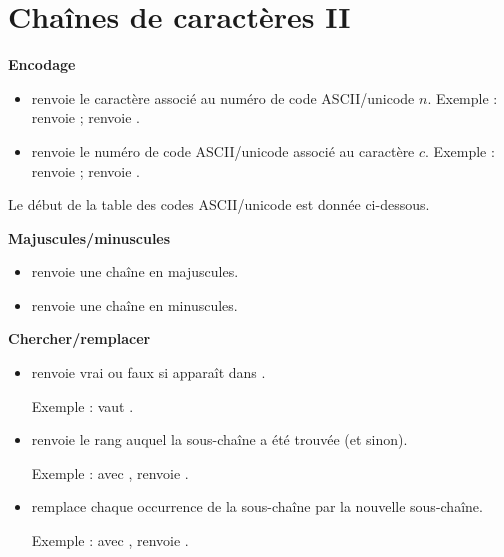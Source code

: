 \documentclass[11pt,class=report,crop=false]{standalone}
\begin{document}
\section{Chaînes de caractères II}



\textbf{Encodage}

\begin{itemize}
  \item {} \quad renvoie le caractère associé au numéro de code ASCII/unicode $n$. Exemple :  renvoie  ;  renvoie .
    
  \item {} \quad renvoie le numéro de code ASCII/unicode associé au caractère $c$. Exemple :  renvoie  ;  renvoie .
\end{itemize}

Le début de la table des codes ASCII/unicode est donnée ci-dessous.


\bigskip

\textbf{Majuscules/minuscules}

\begin{itemize}
  \item {} renvoie une chaîne en majuscules.
  \item {} renvoie une chaîne en minuscules.  
\end{itemize}

\bigskip

\textbf{Chercher/remplacer}

\begin{itemize}
  \item {} \quad renvoie \og{}vrai\fg{} ou \og{}faux\fg{} si  apparaît dans .
  
   Exemple :
 vaut .

  \item  {} \quad renvoie le rang auquel  la sous-chaîne a été trouvée (et  sinon).
  
  Exemple : avec ,  renvoie  .
  
   \item  {} \quad remplace 
   chaque occurrence de la sous-chaîne par la nouvelle sous-chaîne.
   
   Exemple : avec ,  renvoie
   .

\end{itemize}
\end{document}
